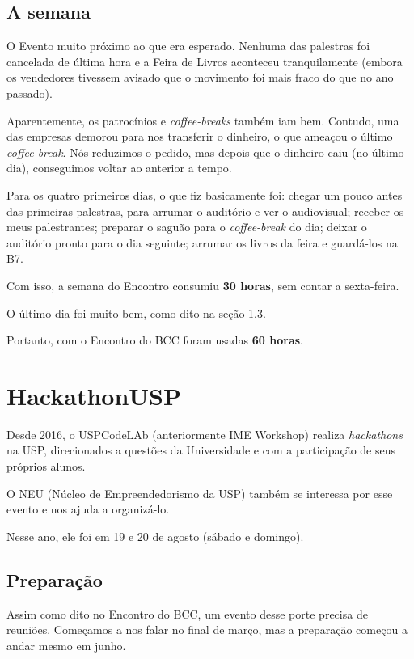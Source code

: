 \documentclass[12pt,letterpaper]{article}
\begin{document}
	\subsection{A semana}
	
	O Evento muito próximo ao que era esperado. Nenhuma das palestras foi cancelada de última hora e a Feira de Livros aconteceu tranquilamente (embora os vendedores tivessem avisado que o movimento foi mais fraco do que no ano passado).
	
	Aparentemente, os patrocínios e \textit{coffee-breaks} também iam bem. Contudo, uma das empresas demorou para nos transferir o dinheiro, o que ameaçou o último \textit{coffee-break}. Nós reduzimos o pedido, mas depois que o dinheiro caiu (no último dia), conseguimos voltar ao anterior a tempo.
	
	Para os quatro primeiros dias, o que fiz basicamente foi: chegar um pouco antes das primeiras palestras, para arrumar o auditório e ver o audiovisual; receber os meus palestrantes; preparar o saguão para o \textit{coffee-break} do dia; deixar o auditório pronto para o dia seguinte; arrumar os livros da feira e guardá-los na B7.
	
	Com isso, a semana do Encontro consumiu \textbf{30 horas}, sem contar a sexta-feira.
	
	O último dia foi muito bem, como dito na seção 1.3.
	
	Portanto, com o Encontro do BCC foram usadas \textbf{60 horas}.
	
	\section{HackathonUSP}
	
	Desde 2016, o USPCodeLAb (anteriormente IME Workshop) realiza \textit{hackathons} na USP, direcionados a questões da Universidade e com a participação de seus próprios alunos.
	
	O NEU (Núcleo de Empreendedorismo da USP) também se interessa por esse evento e nos ajuda a organizá-lo.
	
	Nesse ano, ele foi em 19 e 20 de agosto (sábado e domingo).
	
	\subsection{Preparação}
	
	Assim como dito no Encontro do BCC, um evento desse porte precisa de reuniões. Começamos a nos falar no final de março, mas a preparação começou a andar mesmo em junho.
	
\end{document}
